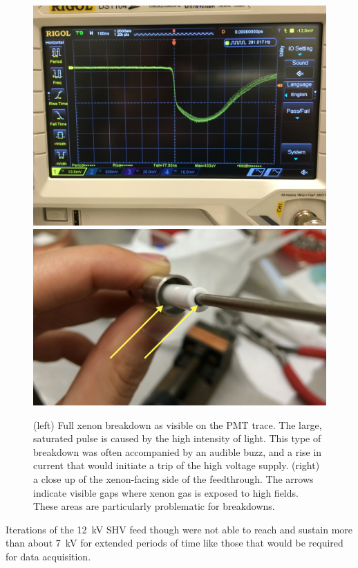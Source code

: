 \begin{figure}[htbp]
\begin{center}
\includegraphics[width=\halffig]{figures/testbed/breakdown.jpg}
\includegraphics[width=\halffig]{figures/testbed/ft_1and2_gasgaps.png}
\caption{(left) Full xenon breakdown as visible on the \acs{PMT} trace. The large, saturated pulse is caused by the high intensity of light. This type of breakdown was often accompanied by an audible buzz, and a rise in current that would initiate a trip of the high voltage supply. (right) a close up of the xenon-facing side of the feedthrough. The arrows indicate visible gaps where xenon gas is exposed to high fields. These areas are particularly problematic for breakdowns.}
\label{fig:breakdown}
\end{center}
\end{figure}

Iterations of the 12~kV \ac{SHV} feed though were not able to reach and sustain more than about 7~kV for extended periods of time like those that would be required for data acquisition.

